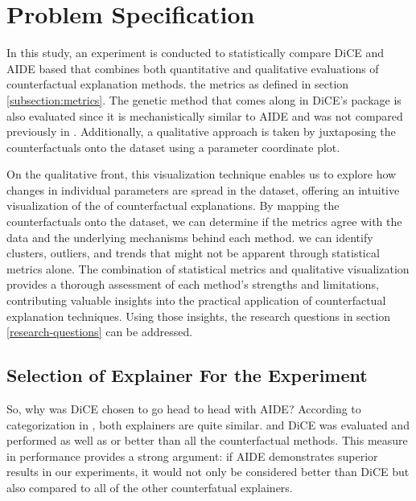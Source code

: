 \chapter{Problem Specification\label{chap:problem-spec}}
In this study, an experiment is conducted to statistically compare DiCE and AIDE based that combines both quantitative and qualitative evaluations of counterfactual explanation methods. the metrics as defined in section \ref{subsection:metrics}. The genetic method that comes along in DiCE's package is also evaluated since it is mechanistically similar to AIDE and was not compared previously in \citet{guidotti2024counterfactual}. Additionally, a qualitative approach is taken by juxtaposing the counterfactuals onto the dataset using a parameter coordinate plot.

On the qualitative front, this visualization technique enables us to explore how changes in individual parameters are spread in the dataset, offering an intuitive visualization of the of counterfactual explanations. By mapping the counterfactuals onto the dataset, we can determine if the metrics agree with the data and the underlying mechanisms behind each method. we can identify clusters, outliers, and trends that might not be apparent through statistical metrics alone. The combination of statistical metrics and qualitative visualization provides a thorough assessment of each method’s strengths and limitations, contributing valuable insights into the practical application of counterfactual explanation techniques. Using those insights, the research questions in section \ref{research-questions} can be addressed. 

\section{Selection of Explainer For the Experiment}
So, why was DiCE chosen to go head to head with AIDE? According to categorization in \citet{guidotti2024counterfactual}, both explainers are quite similar. 
and DiCE was evaluated and performed as well as or better than all the counterfactual methods. This measure in performance provides a strong argument: if AIDE demonstrates superior results in our experiments, it would not only be considered better than DiCE but also compared to all of the other counterfatual explainers.


